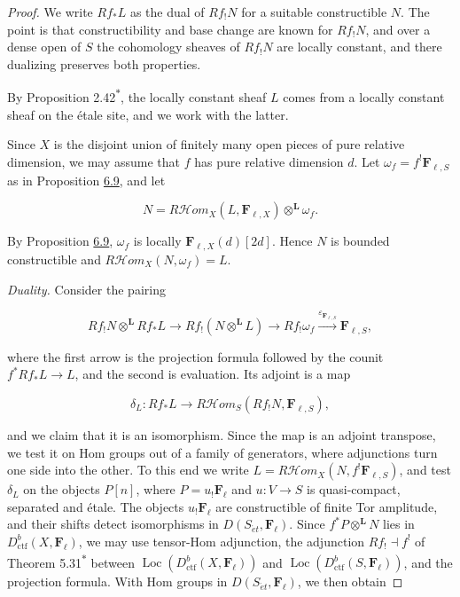 \documentclass[11pt]{article}
\newcommand{\bpout}[1]{#1\textsuperscript{\hyperlink{bp-outside}{\ensuremath{\ast}}}}
\providecommand{\Fell}{}\renewcommand{\Fell}{\mathbf F_\ell}
\providecommand{\Loc}{}\renewcommand{\Loc}{\operatorname{Loc}}
\providecommand{\cHom}{}\renewcommand{\cHom}{R\mathcal{H}\!om}
\begin{document}
\begin{proof}[{Proof}]\label{bp34}%
We write \(Rf_*L\) as the dual of \(Rf_!N\) for a suitable constructible \(N\). The point is that constructibility and base change are known for \(Rf_!N\), and over a dense open of \(S\) the cohomology sheaves of \(Rf_!N\) are locally constant, and there dualizing preserves both properties.

By Proposition \bpout{2.42}, the locally constant sheaf \(L\) comes from a locally constant sheaf on the étale site, and we work with the latter.

Since \(X\) is the disjoint union of finitely many open pieces of pure relative dimension, we may assume that \(f\) has pure relative dimension \(d\). Let \(\omega_f=f^!\mathbf F_{\ell,S}\) as in Proposition \hyperref[bp30]{6.9}, and let

\[
N=\cHom_X(L,\mathbf F_{\ell,X})\otimes^{\mathbf L}\omega_f .
\]

By Proposition \hyperref[bp30]{6.9}, \(\omega_f\) is locally \(\mathbf F_{\ell,X}(d)[2d]\). Hence \(N\) is bounded constructible and \(\cHom_X(N,\omega_f)=L\).

\emph{Duality.} Consider the pairing

\[
Rf_!N\otimes^{\mathbf L}Rf_*L
\longrightarrow Rf_!(N\otimes^{\mathbf L}L)
\longrightarrow Rf_!\omega_f
\xrightarrow{\varepsilon_{\mathbf F_{\ell,S}}}\mathbf F_{\ell,S},
\tag{6.15}
\]

where the first arrow is the projection formula followed by the counit \(f^*Rf_*L\to L\), and the second is evaluation. Its adjoint is a map

\[
\delta_L:Rf_*L
\longrightarrow \cHom_S(Rf_!N,\mathbf F_{\ell,S}),
\tag{6.16}
\]

and we claim that it is an isomorphism. Since the map is an adjoint transpose, we test it on Hom groups out of a family of generators, where adjunctions turn one side into the other. To this end we write \(L=\cHom_X(N,f^!\mathbf F_{\ell,S})\), and test \(\delta_L\) on the objects \(P[n]\), where \(P=u_!\Fell\) and \(u:V\to S\) is quasi-compact, separated and étale. The objects \(u_!\Fell\) are constructible of finite Tor amplitude, and their shifts detect isomorphisms in \(D(S_{\acute{e}t},\Fell)\). Since \(f^*P\otimes^{\mathbf L}N\) lies in \(D^b_{\mathrm{ctf}}(X,\Fell)\), we may use tensor-Hom adjunction, the adjunction \(Rf_!\dashv f^!\) of Theorem \bpout{5.31} between \(\Loc(D^b_{\mathrm{ctf}}(X,\Fell))\) and \(\Loc(D^b_{\mathrm{ctf}}(S,\Fell))\), and the projection formula. With Hom groups in \(D(S_{\acute{e}t},\Fell)\), we then obtain


\end{proof}
\end{document}
